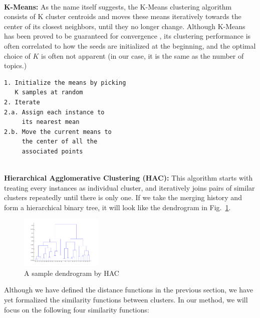 \documentclass[conference]{IEEEtran}
\begin{document}
\-\\
\textbf{K-Means:} As the name itself suggests, the K-Means clustering algorithm consists of K cluster centroids and moves these means iteratively towards the center of its closest neighbors, until they no longer change. Although K-Means has been proved to be guaranteed for convergence \cite{selim1984}, its clustering performance is often correlated to how the seeds are initialized at the beginning, and the optimal choice of $K$ is often not apparent (in our case, it is the same as the number of topics.)

\begin{verbatim}
1. Initialize the means by picking 
   K samples at random
2. Iterate
2.a. Assign each instance to 
     its nearest mean
2.b. Move the current means to 
	 the center of all the 
	 associated points
\end{verbatim}
\-\\
\textbf{Hierarchical Agglomerative Clustering (HAC):} This algorithm starts with treating every instances as individual cluster, and iteratively joins pairs of similar clusters repeatedly until there is only one. If we take the merging history and form a hierarchical binary tree, it will look like the dendrogram in Fig.~\ref{dendrogram}.

\begin{figure}[h]
	\center	
	\includegraphics[width=0.35\textwidth]{fig/dendrogram.png}
	\caption{A sample dendrogram by HAC}
	\label{dendrogram}
\end{figure}

Although we have defined the distance functions in the previous section, we have yet formalized the similarity functions between clusters. In our method, we will focus on the following four similarity functions:
\end{document}
